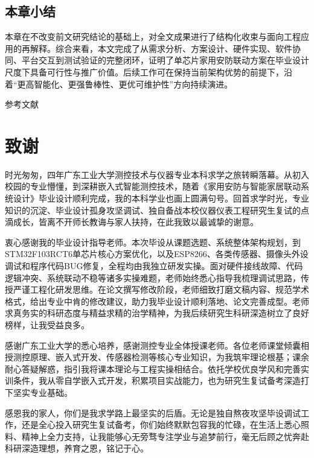 \documentclass[UTF8,12pt,a4paper,oneside]{ctexbook}
\numberwithin{equation}{chapter}
\begin{document}
\section{本章小结}
本章在不改变前文研究结论的基础上，对全文成果进行了结构化收束与面向工程应用的再解释。综合来看，本文完成了从需求分析、方案设计、硬件实现、软件协同、平台交互到测试验证的完整闭环，证明了单芯片家用安防联动方案在毕业设计尺度下具备可行性与推广价值。后续工作可在保持当前架构优势的前提下，沿着“更高智能化、更强鲁棒性、更优可维护性”方向持续演进。

\clearpage
\begin{center}
{\heiti{}参考文献}
\end{center}
\printbibliography[heading=none]

\chapter*{致谢}
时光匆匆，四年广东工业大学测控技术与仪器专业本科求学之旅转瞬落幕。从初入校园的专业懵懂，到深耕嵌入式智能测控技术，随着《家用安防与智能家居联动系统设计》毕业设计顺利完成，我的本科学业也画上圆满句号。回首求学时光，专业知识的沉淀、毕业设计孤身攻坚调试、独自备战本校仪器仪表工程研究生复试的点滴成长，皆离不开师长教诲与家人扶持，在此我致以最诚挚的谢意。

衷心感谢我的毕业设计指导老师。本次毕设从课题选题、系统整体架构规划，到STM32F103RCT6单芯片核心方案优化，以及ESP8266、各类传感器、摄像头外设调试和程序代码BUG修复，全程均由我独立研发实操。面对硬件接线故障、代码逻辑冲突、系统联动不稳等诸多实操难题，老师始终悉心指导我梳理调试思路，传授严谨工程化研发思维。在论文撰写修改阶段，老师细致打磨文稿内容、规范学术格式，给出专业中肯的修改建议，助力我毕业设计顺利落地、论文完善成型。老师求真务实的科研态度与精益求精的治学精神，为我后续研究生科研深造树立了良好榜样，让我受益良多。

感谢广东工业大学的悉心培养，感谢测控专业全体授课老师。各位老师课堂倾囊相授测控原理、嵌入式开发、传感器检测等核心专业知识，为我筑牢理论根基；课余耐心答疑解惑，指引我将课本理论与工程实操相结合。依托学校优良学风和完善实训条件，我从零自学嵌入式开发，积累项目实战能力，也为研究生复试备考深造打下坚实专业基础。

感恩我的家人，你们是我求学路上最坚实的后盾。无论是独自熬夜攻坚毕设调试工作，还是全心投入研究生复试备考，你们始终默默包容我的忙碌，在生活上悉心照料、精神上全力支持，让我能够心无旁骛专注学业与追梦前行，毫无后顾之忧奔赴科研深造理想，养育之恩，铭记于心。
\end{document}
